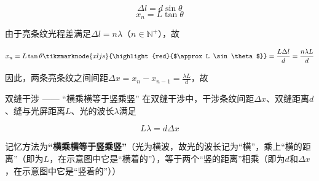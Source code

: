 $$ \Delta l = d \sin \theta $$
$$ x_n = L \tan \theta $$

由于亮条纹光程差满足$\Delta l = n \lambda$（$n \in \mathbb{N^{+}}$），故

\begin{subequations}
\begin{align*}
x_n = L \tan \theta \tikzmarknode{xljs}{\highlight{red}{$\approx L \sin \theta$}} = \frac{L \Delta l}{d} = \frac{n \lambda L}{d}
\end{align*}
\end{subequations}


\vspace{2\baselineskip}
因此，两条亮条纹之间间距$\Delta x = x_n - x_{n-1} = \frac{\lambda L}{d}$，故

\begin{theo}{双缝干涉 —— “横乘横等于竖乘竖”}{}
在双缝干涉中，干涉条纹间距$\Delta x$、双缝距离$d$、缝与光屏距离$L$、光的波长$\lambda$满足

$$L \lambda = d \Delta x$$

记忆方法为\textbf{“横乘横等于竖乘竖”}（光为横波，故光的波长记为“横”，乘上“横的距离”（即为$L$，在示意图中它是“横着的”），等于两个“竖的距离”相乘（即为$d$和$\Delta x$，在示意图中它是“竖着的”））
\end{theo}


